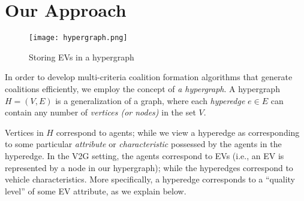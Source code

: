
\chapter{Our Approach} %

\label{Chapter6_approach} %









\begin{figure}
	\centering
	\texttt{[image: hypergraph.png]}
	\caption{Storing EVs in a hypergraph\label{fig:hypergraph}}
\end{figure}
In order to develop multi-criteria coalition formation algorithms that generate coalitions efficiently, we employ the concept of {\em a hypergraph}.
A hypergraph $H = (V, E)$ is a generalization of a graph, where each {\em hyperedge} $e \in E$ can contain any number of {\em vertices (or nodes)} in the set $V$.

Vertices in $H$ correspond to agents; while we view a hyperedge as corresponding to some particular {\em attribute} or {\em characteristic} possessed by the agents in the hyperedge.
In the V2G setting, the agents correspond to EVs (i.e., an EV is represented by a node in our hypergraph); while the hyperedges correspond to vehicle characteristics. More specifically, a hyperedge corresponds to a ``quality level'' of some EV attribute, as we explain below.

